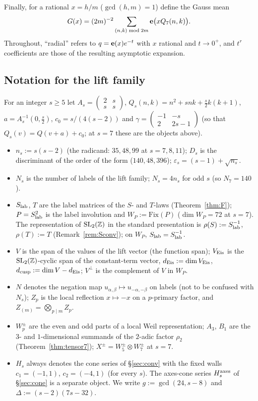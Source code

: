 Finally, for a rational $x=h/m$ ($\gcd(h,m)=1$) define the Gauss mean
\[
G(x)=(2m)^{-2}\sum_{(n,k)\bmod 2m}\mathbf{e}\bigl(xQ_7(n,k)\bigr).
\]
Throughout, ``radial'' refers to $q=\mathbf{e}(x)e^{-t}$ with $x$ rational and $t\to0^+$, and $t^{r}$ coefficients are those of the resulting asymptotic expansion.

\subsection{Notation for the lift family}\label{sec:notation}
For an integer $s\ge5$ let $A_s=\left(\begin{smallmatrix}2&s\\s&s\end{smallmatrix}\right)$, $Q_s(n,k)=n^2+snk+\tfrac s2k(k+1)$, $a=A_s^{-1}(0,\tfrac s2)$,
$c_0=s/(4(s-2))$ and $\gamma=\left(\begin{smallmatrix}-1&-s\\2&2s-1\end{smallmatrix}\right)$ (so that $Q_s(v)=Q(v+a)+c_0$; at $s=7$ these are the objects above).
\begin{itemize}[leftmargin=2em]
\item $n_s:=s(s-2)$ (the radicand: $35,48,99$ at $s=7,8,11$); $D_s$ is the discriminant of the order of the form ($140,48,396$); $\varepsilon_s=(s-1)+\sqrt{n_s}$.
\item $N_s$ is the number of labels of the lift family; $N_s=4n_s$ for odd $s$ (so $N_7=140$).
\item $S_{\rm lab}$, $T$ are the label matrices of the $S$- and $T$-laws (Theorem~\ref{thm:F}); $P=S_{\rm lab}^2$ is the label involution and
$W_P:=\mathrm{Fix}(P)$ ($\dim W_P=72$ at $s=7$). The representation of $\mathrm{SL}_2(\mathbb{Z})$ in the standard presentation is $\rho(S):=S_{\rm lab}^{-1}$,
$\rho(T):=T$ (Remark~\ref{rem:Sconv}); on $W_P$, $S_{\rm lab}=S_{\rm lab}^{-1}$.
\item $V$ is the span of the values of the lift vector (the function span); $V_{\rm Eis}$ is the $\mathrm{SL}_2(\mathbb{Z})$-cyclic span of the constant-term
vector, $d_{\rm Eis}:=\dim V_{\rm Eis}$, $d_{\rm cusp}:=\dim V-d_{\rm Eis}$; $V^\perp$ is the complement of $V$ in $W_P$.
\item $N$ denotes the negation map $u_{\alpha,\beta}\mapsto u_{-\alpha,-\beta}$ on labels (not to be confused with $N_s$); $Z_p$ is the local
reflection $x\mapsto-x$ on a $p$-primary factor, and $Z_{(m)}=\bigotimes_{p\mid m}Z_p$.
\item $W_p^\pm$ are the even and odd parts of a local Weil representation; $A_3$, $B_1$ are the $3$- and $1$-dimensional summands of the
$2$-adic factor $\rho_2$ (Theorem~\ref{thm:tensor7}); $X^\pm=W_5^\pm\otimes W_7^\pm$ at $s=7$.
\item $H_s$ always denotes the cone series of \S\ref{sec:conv} with the fixed walls $c_1=(-1,1)$, $c_2=(-4,1)$ (for every $s$). The axes-cone series
$H_s^{\rm axes}$ of \S\ref{sec:cone} is a separate object. We write $g:=\gcd(24,s-8)$ and $\Delta:=(s-2)(7s-32)$.
\end{itemize}
